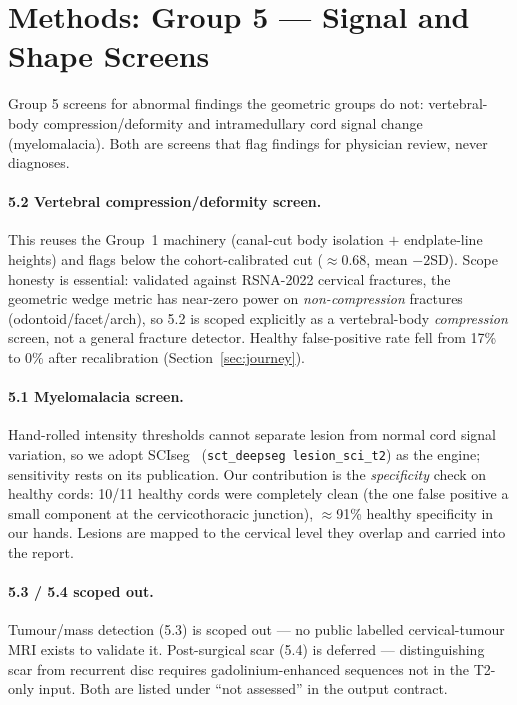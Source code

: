 \section{Methods: Group 5 --- Signal and Shape Screens}
\label{sec:g5}

Group 5 screens for abnormal findings the geometric groups do not: vertebral-body
compression/deformity and intramedullary cord signal change (myelomalacia). Both are screens that flag
findings for physician review, never diagnoses.

\paragraph{5.2 Vertebral compression/deformity screen.} This reuses the Group~1 \hahp{} machinery
(canal-cut body isolation $+$ endplate-line heights) and flags \hahp{} below the cohort-calibrated cut
($\approx 0.68$, mean $-2$SD). Scope honesty is essential: validated against RSNA-2022 cervical fractures,
the geometric wedge metric has near-zero power on \emph{non-compression} fractures (odontoid/facet/arch),
so 5.2 is scoped explicitly as a vertebral-body \emph{compression} screen, not a general fracture
detector. Healthy false-positive rate fell from 17\% to 0\% after recalibration
(Section~\ref{sec:journey}).

\paragraph{5.1 Myelomalacia screen.} Hand-rolled intensity thresholds cannot separate lesion from normal
cord signal variation, so we adopt SCIseg~\cite{sciseg2024} (\texttt{sct\_deepseg lesion\_sci\_t2}) as the
engine; sensitivity rests on its publication. Our contribution is the \emph{specificity} check on healthy
cords: 10/11 healthy cords were completely clean (the one false positive a small component at the
cervicothoracic junction), $\approx$91\% healthy specificity in our hands. Lesions are mapped to the
cervical level they overlap and carried into the report.

\paragraph{5.3 / 5.4 scoped out.} Tumour/mass detection (5.3) is scoped out --- no public labelled
cervical-tumour MRI exists to validate it. Post-surgical scar (5.4) is deferred --- distinguishing scar
from recurrent disc requires gadolinium-enhanced sequences not in the T2-only input. Both are listed under
``not assessed'' in the output contract.

